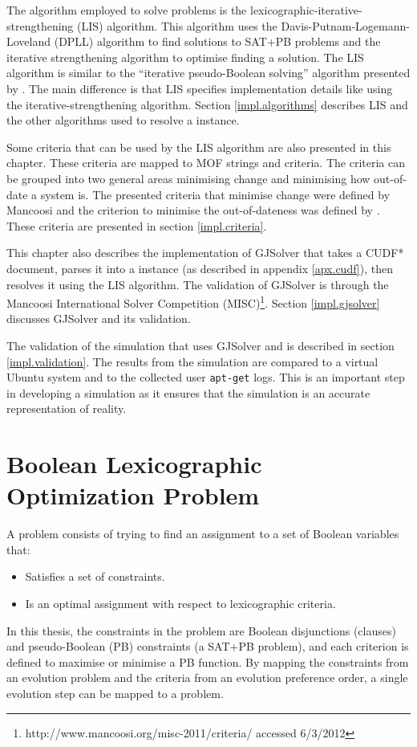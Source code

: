 The algorithm employed to solve \modelimpl problems is the lexicographic-iterative-strengthening (LIS) algorithm.
This algorithm uses the Davis-Putnam-Logemann-Loveland (DPLL) \citep{Davis1960, davis1962machine} algorithm to find solutions to SAT+PB problems
and the iterative strengthening \citep{calistri1994iterative, le2010sat4j} algorithm to optimise finding a solution.
The LIS algorithm is similar to the ``iterative pseudo-Boolean solving'' algorithm presented by \cite{marque2011blex}.
The main difference is that LIS specifies implementation details like using the iterative-strengthening algorithm.
Section \ref{impl.algorithms} describes LIS and the other algorithms used to resolve a \modelname instance.

Some criteria that can be used by the LIS algorithm are also presented in this chapter. 
These criteria are mapped to MOF strings and \modelname criteria.
The criteria can be grouped into two general areas minimising change and minimising how out-of-date a system is.
The presented criteria that minimise change were defined by Mancoosi and the criterion to minimise the out-of-dateness was defined by \cite{leBerre2010}.
These criteria are presented in section \ref{impl.criteria}.

This chapter also describes the implementation of GJSolver that takes a CUDF* document, parses it into a \modelname instance (as described in appendix \ref{apx.cudf}),
then resolves it using the LIS algorithm.
The validation of GJSolver is through the Mancoosi International Solver Competition (MISC)\footnote{http://www.mancoosi.org/misc-2011/criteria/ accessed 6/3/2012}.
Section \ref{impl.gjsolver} discusses GJSolver and its validation.

The validation of the simulation that uses GJSolver and \usermodel is described in section \ref{impl.validation}.
The results from the simulation are compared to a virtual Ubuntu system and to the collected user \texttt{apt-get} logs.
This is an important step in developing a simulation as it ensures that the simulation is an accurate representation of reality. 

\section{Boolean Lexicographic Optimization Problem}
\label{impl.blo}
A \modelimpl problem consists of trying to find an assignment to a set of Boolean variables that:
\begin{itemize}
  \item Satisfies a set of constraints.
  \item Is an optimal assignment with respect to lexicographic criteria.
\end{itemize}
In this thesis, the constraints in the \modelimpl problem are Boolean disjunctions (clauses) and pseudo-Boolean (PB) constraints (a SAT+PB problem),
and each criterion is defined to maximise or minimise a PB function.
By mapping the constraints from an evolution problem and the criteria from an evolution preference order,
a single evolution step can be mapped to a \modelimpl problem.

